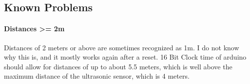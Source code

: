 \subsection{Known Problems}

\paragraph{Distances >= 2m}
Distances of 2 meters or above are sometimes recognized as 1m. I do not know why this is, and it mostly works again after a reset. 16 Bit Clock time of arduino should allow for distances of up to about 5.5 meters, which is well above the maximum distance of the ultrasonic sensor, which is 4 meters.